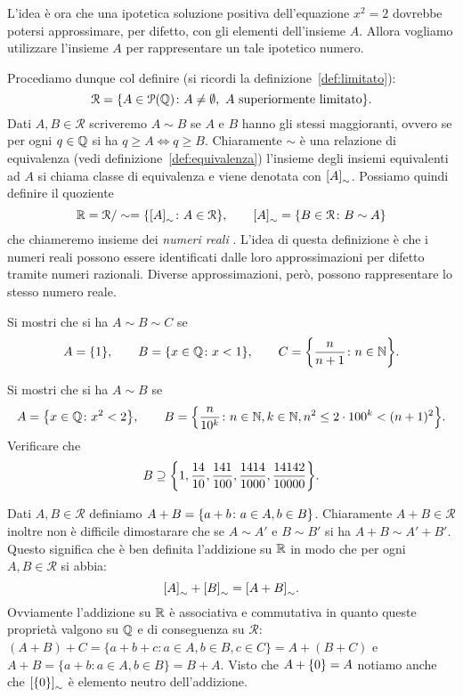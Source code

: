 L'idea è ora che una ipotetica soluzione positiva dell'equazione $x^2=2$ 
dovrebbe potersi approssimare, per difetto, con gli elementi dell'insieme $A$.
Allora vogliamo utilizzare l'insieme $A$ per rappresentare un tale ipotetico numero.

Procediamo dunque col definire (si ricordi la definizione~\ref{def:limitato}):
\[
\mathcal R = {\left\{ A \in \mathcal P({\mathbb Q})\colon A\neq \emptyset, \text{ $A$ superiormente 
limitato} \right\}}.
\]
Dati $A,B\in \mathcal R$ scriveremo $A\sim B$ 
se $A$ e $B$ hanno gli stessi maggioranti, ovvero
se per ogni $q\in {\mathbb Q}$ si ha $q\ge A \iff q\ge B$.
Chiaramente $\sim$ è una relazione di equivalenza (vedi definizione~\ref{def:equivalenza})
l'insieme degli insiemi equivalenti ad $A$ si chiama 
classe di equivalenza e viene denotata con ${\left[ A \right]}_\sim$.
Possiamo quindi definire il quoziente
\[
  {\mathbb R} = \mathcal R / \sim = {\left\{ {\left[ A \right]}_\sim\colon A\in \mathcal R \right\}},
  \qquad 
  {\left[ A \right]}_\sim = {\left\{ B\in \mathcal R\colon B\sim A \right\}}
\]
che chiameremo insieme dei \emph{numeri reali}%
%
.
L'idea di questa definizione è che i numeri reali 
possono essere identificati dalle loro approssimazioni 
per difetto tramite numeri razionali. 
Diverse approssimazioni, però, possono rappresentare 
lo stesso numero reale.

\begin{exercise}
  Si mostri che si ha $A \sim B \sim C$ se
  \[
  A = {\left\{ 1 \right\}}, \qquad 
  B = {\left\{ x\in {\mathbb Q}\colon x<1 \right\}}, \qquad
  C = {\left\{ \frac{n}{n+1}\colon n\in {\mathbb N} \right\}}.
  \]
\end{exercise}

\begin{exercise}
  Si mostri che si ha $A\sim B$ se
  \[
  A = {\left\{ x\in {\mathbb Q}\colon x^2<2 \right\}}, \qquad
  B = {\left\{ \frac{n}{10^k}\colon n\in {\mathbb N}, k\in {\mathbb N}, n^2 \le 2\cdot 100^k < (n+1)^2 \right\}}.  
  \]
  Verificare che 
  \[
    B \supseteq {\left\{ 
      1,\frac{14}{10},\frac{141}{100},\frac{1414}{1000},
      \frac{14142}{10000} \right\}}.
  \]
\end{exercise}

Dati $A,B\in\mathcal R$ definiamo $A+B={\left\{ a+b\colon a\in A, b\in B \right\}}$.
Chiaramente $A+B\in \mathcal R$ inoltre non è difficile dimostarare che 
se $A\sim A'$ e $B\sim B'$ si ha $A+B\sim A'+B'$.
Questo significa che è ben definita l'addizione su ${\mathbb R}$ in modo che 
per ogni $A,B \in \mathcal R$ si abbia:
\[
{\left[ A \right]}_\sim + {\left[ B \right]}_\sim = {\left[ A+B \right]}_\sim.
\]
Ovviamente l'addizione su ${\mathbb R}$ è associativa e commutativa in quanto 
queste proprietà valgono su ${\mathbb Q}$ e di conseguenza su $\mathcal R$:
$(A+B)+C = \{ a+b+c\colon a\in A, b\in B, c\in C\} = A + (B+C)$ e 
$A+B = \{a+b\colon a\in A, b\in B\} = B+A$.
Visto che $A+{\left\{ 0 \right\}} = A$ notiamo anche che ${\left[ {\left\{ 0 \right\}} \right]}_\sim$ 
è elemento neutro dell'addizione.

